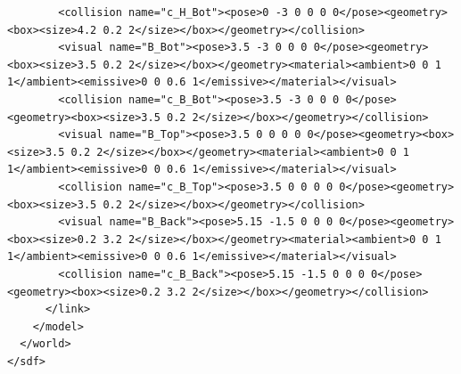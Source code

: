 \begin{lstlisting}
        <collision name="c_H_Bot"><pose>0 -3 0 0 0 0</pose><geometry><box><size>4.2 0.2 2</size></box></geometry></collision>
        <visual name="B_Bot"><pose>3.5 -3 0 0 0 0</pose><geometry><box><size>3.5 0.2 2</size></box></geometry><material><ambient>0 0 1 1</ambient><emissive>0 0 0.6 1</emissive></material></visual>
        <collision name="c_B_Bot"><pose>3.5 -3 0 0 0 0</pose><geometry><box><size>3.5 0.2 2</size></box></geometry></collision>
        <visual name="B_Top"><pose>3.5 0 0 0 0 0</pose><geometry><box><size>3.5 0.2 2</size></box></geometry><material><ambient>0 0 1 1</ambient><emissive>0 0 0.6 1</emissive></material></visual>
        <collision name="c_B_Top"><pose>3.5 0 0 0 0 0</pose><geometry><box><size>3.5 0.2 2</size></box></geometry></collision>
        <visual name="B_Back"><pose>5.15 -1.5 0 0 0 0</pose><geometry><box><size>0.2 3.2 2</size></box></geometry><material><ambient>0 0 1 1</ambient><emissive>0 0 0.6 1</emissive></material></visual>
        <collision name="c_B_Back"><pose>5.15 -1.5 0 0 0 0</pose><geometry><box><size>0.2 3.2 2</size></box></geometry></collision>
      </link>
    </model>
  </world>
</sdf>
\end{lstlisting}


